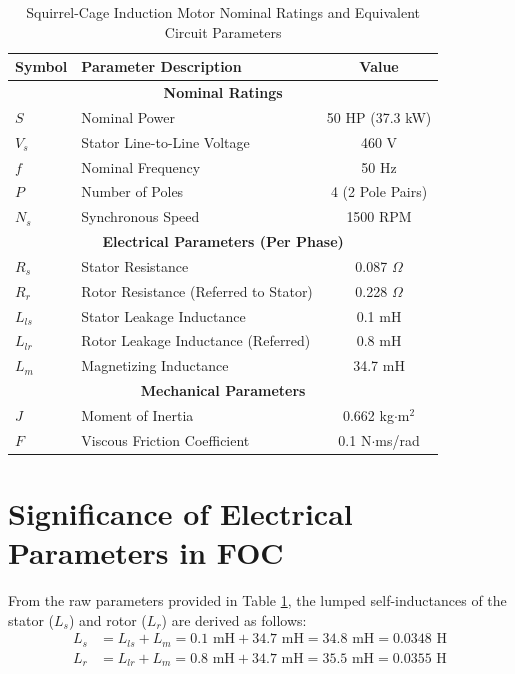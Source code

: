 \documentclass[12pt,a4paper]{report}
\begin{document}
\begin{table}[H]
\centering
\caption{Squirrel-Cage Induction Motor Nominal Ratings and Equivalent Circuit Parameters}
\label{tab:motor_params}
\begin{tabular}{llc}
\toprule
\textbf{Symbol} & \textbf{Parameter Description} & \textbf{Value} \\
\midrule
\multicolumn{3}{c}{\textbf{Nominal Ratings}} \\
\midrule
$S$ & Nominal Power & 50 HP (37.3 kW) \\
$V_{s}$ & Stator Line-to-Line Voltage & 460 V \\
$f$ & Nominal Frequency & 50 Hz \\
$P$ & Number of Poles & 4 (2 Pole Pairs) \\
$N_{s}$ & Synchronous Speed & 1500 RPM \\
\midrule
\multicolumn{3}{c}{\textbf{Electrical Parameters (Per Phase)}} \\
\midrule
$R_{s}$ & Stator Resistance & 0.087 $\Omega$ \\
$R_{r}$ & Rotor Resistance (Referred to Stator) & 0.228 $\Omega$ \\
$L_{ls}$ & Stator Leakage Inductance & 0.1 mH \\
$L_{lr}$ & Rotor Leakage Inductance (Referred) & 0.8 mH \\
$L_{m}$ & Magnetizing Inductance & 34.7 mH \\
\midrule
\multicolumn{3}{c}{\textbf{Mechanical Parameters}} \\
\midrule
$J$ & Moment of Inertia & 0.662 kg$\cdot$m$^2$ \\
$F$ & Viscous Friction Coefficient & 0.1 N$\cdot$ms/rad \\
\bottomrule
\end{tabular}
\end{table}

\section{Significance of Electrical Parameters in FOC}
From the raw parameters provided in Table \ref{tab:motor_params}, the lumped self-inductances of the stator ($L_s$) and rotor ($L_r$) are derived as follows:
\begin{align}
L_{s} &= L_{ls} + L_{m} = 0.1 \text{ mH} + 34.7 \text{ mH} = 34.8 \text{ mH} = 0.0348 \text{ H} \\
L_{r} &= L_{lr} + L_{m} = 0.8 \text{ mH} + 34.7 \text{ mH} = 35.5 \text{ mH} = 0.0355 \text{ H}
\end{align}
\end{document}
